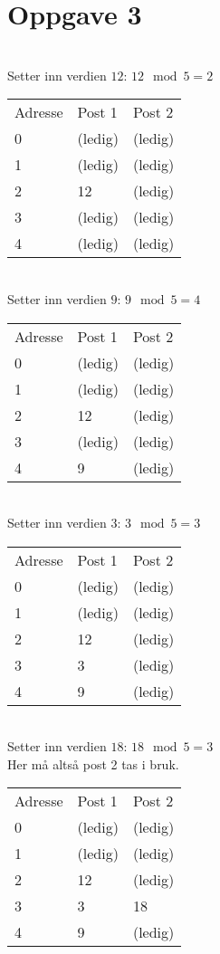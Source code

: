 \section{Oppgave 3}
~\\
Setter inn verdien $12$: $12 \mod 5 = 2$\\
\begin{tabular}{|l|l|l|}
    \hline
    Adresse & Post 1 & Post 2 \\
    0       & (ledig)& (ledig)\\
    1       & (ledig)& (ledig)\\
    2       & 12     & (ledig)\\
    3       & (ledig)& (ledig)\\
    4       & (ledig)& (ledig)\\ \hline
\end{tabular}

~\\
Setter inn verdien $9$: $9 \mod 5 = 4$\\
\begin{tabular}{|l|l|l|}
    \hline
    Adresse & Post 1 & Post 2 \\
    0       & (ledig)& (ledig)\\
    1       & (ledig)& (ledig)\\
    2       & 12     & (ledig)\\
    3       & (ledig)& (ledig)\\
    4       & 9      & (ledig)\\ \hline
\end{tabular}

~\\
Setter inn verdien $3$: $3 \mod 5 = 3$\\
\begin{tabular}{|l|l|l|}
    \hline
    Adresse & Post 1 & Post 2 \\
    0       & (ledig)& (ledig)\\
    1       & (ledig)& (ledig)\\
    2       & 12     & (ledig)\\
    3       & 3      & (ledig)\\
    4       & 9      & (ledig)\\ \hline
\end{tabular}

~\\
Setter inn verdien $18$: $18 \mod 5 = 3$\\
Her må altså post 2 tas i bruk.\\
\begin{tabular}{|l|l|l|}
    \hline
    Adresse & Post 1 & Post 2 \\
    0       & (ledig)& (ledig)\\
    1       & (ledig)& (ledig)\\
    2       & 12     & (ledig)\\
    3       & 3      & 18      \\
    4       & 9      & (ledig)\\ \hline
\end{tabular}

